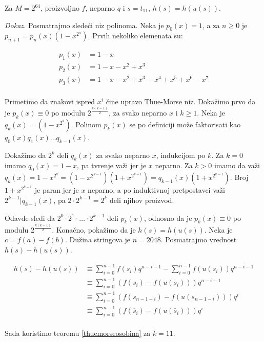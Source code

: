 \begin{thm}
Za $M = 2^{64}$, proizvoljno $f$, neparno $q$ i $s = t_{11}$, $h(s) = h(u(s))$.
\end{thm}

\textit{Dokaz.} Posmatrajmo slede\' ci niz polinoma. Neka je $p_0(x) = 1$, a za $n \geq 0$ je $p_{n+1} = p_n(x)(1-x^{2^n})$. Prvih nekoliko elemenata su:

\begin{align*}
    p_1(x) & = 1-x \\
    p_2(x) & = 1-x-x^2+x^3 \\
    p_3(x) & = 1 - x - x^2 + x^3 - x^4 + x^5 + x^6 - x^7 \\
\end{align*}

Primetimo da znakovi ispred $x^i$ \v cine upravo Thue-Morse niz. Doka\v zimo prvo da je $p_k(x) \equiv 0$ po modulu $2^\frac{k(k-1)}{2}$, za svako neparno $x$ i $k \geq 1$. Neka je $q_k(x) = (1-x^{2^k})$. Polinom $p_k(x)$ se po definiciji mo\v ze faktorisati kao $q_0(x)q_1(x)\ldots q_{k-1}(x)$.

Doka\v zimo da $2^k$ deli $q_k(x)$ za svako neparno $x$, indukcijom po $k$. Za $k=0$ imamo $q_0(x) = 1-x$, pa tvr\dj enje va\v zi jer je $x$ neparno. Za $k > 0$ imamo da va\v zi $q_k(x) = 1-x^{2^k} = (1-x^{2^{k-1}})(1+x^{2^{k-1}}) = q_{k-1}(x)(1+x^{2^{k-1}})$. Broj $1+x^{2^{k-1}}$ je paran jer je $x$ neparno, a po induktivnoj pretpostavci va\v zi $2^{k-1} | q_{k-1}(x)$, pa $2\cdot 2^{k-1} = 2^k$ deli njihov proizvod.

Odavde sledi da $2^0\cdot2^1\cdot \ldots \cdot 2^{k-1}$ deli $p_k(x)$, odnosno da je $p_k(x) \equiv 0$ po modulu $2^\frac{k(k-1)}{2}$. Kona\v cno, poka\v zimo da je $h(s) = h(u(s))$. Neka je $c = f(a) - f(b)$. Du\v zina stringova je $n = 2048$. Posmatrajmo vrednost $h(s) - h(u(s))$.

\begin{align*}
h(s) - h(u(s)) & \equiv \sum_{i=0}^{n-1}f(s_i) q^{n-i-1} - \sum_{i=0}^{n-1}f(u(s_i)) q^{n-i-1} \\
               & \equiv \sum_{i=0}^{n-1}(f(s_i) - f(u(s_i))) q^{n-i-1} \\
               & \equiv \sum_{i=0}^{n-1}(f(s_{n-1-i}) - f(u(s_{n-1-i}))) q^i \\
               & \equiv \sum_{i=0}^{n-1}(f(\overline{s}_i) - f(u(\overline{s}_i))) q^i \\
\end{align*}

Sada koristimo teoremu \ref{thuemorseosobina} za $k=11$.

